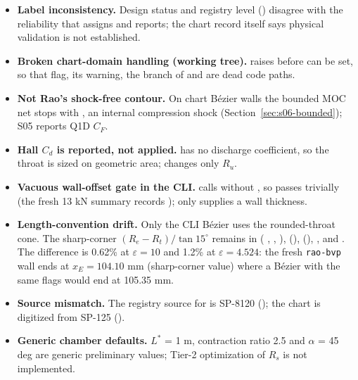 \begin{itemize}
  \item \textbf{Label inconsistency.} Design status  and registry level
   () disagree with the reliability
   that  assigns and  reports; the chart
  record itself says physical validation is not established.
  \item \textbf{Broken chart-domain handling (working tree).}  raises before
   can be set, so that flag, its warning, the  branch
  of  and  are dead code paths.
  \item \textbf{Not Rao's shock-free contour.} On chart B\'ezier walls the bounded MOC net stops with
  , an internal compression shock (Section~\ref{sec:s06-bounded}); S05 reports Q1D $C_F$.
  \item \textbf{Hall $C_d$ is reported, not applied.}  has no discharge coefficient, so the
  throat is sized on geometric area;  changes only $R_u$.
  \item \textbf{Vacuous wall-offset gate in the CLI.}  calls
   without , so 
  passes trivially (the fresh 13 kN summary records ); only 
  supplies a wall thickness.
  \item \textbf{Length-convention drift.} Only the CLI B\'ezier uses the rounded-throat cone. The sharp-corner
  $(R_e - R_t)/\tan 15^\circ$ remains in  ( ,
  , ),  (),
   (), ,  and
  . The difference is 0.62\% at $\varepsilon = 10$ and 1.2\% at
  $\varepsilon = 4.524$: the fresh \texttt{rao-bvp} wall ends at $x_E = 104.10$ mm (sharp-corner value) where
  a B\'ezier with the same flags would end at 105.35 mm.
  \item \textbf{Source mismatch.} The registry source for  is SP-8120
  (); the chart is digitized from SP-125 ().
  \item \textbf{Generic chamber defaults.} $L^*$ = 1 m, contraction ratio 2.5 and $\alpha$ = 45 deg are generic
  preliminary values; Tier-2 optimization of $R_s$ is not implemented.
\end{itemize}

